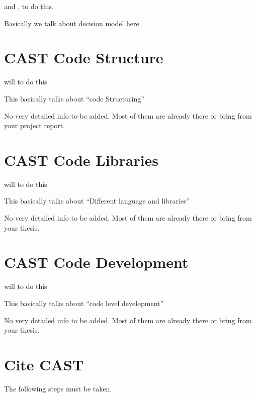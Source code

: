 \documentclass[letterpaper,10pt,english]{sphinxmanual}
\begin{document}
\sphinxAtStartPar
{} and  , to do this.

\sphinxAtStartPar
Basically we talk about decision model here


\chapter{CAST Code Structure}
\label{\detokenize{contents/develop/code_structure:cast-code-structure}}\label{\detokenize{contents/develop/code_structure::doc}}
\sphinxAtStartPar
{} will to do this

\sphinxAtStartPar
This basically talks about “code Structuring”

\sphinxAtStartPar
No very detailed info to be added.
Most of them are already there\sphinxhyphen{} or bring from your project report.


\chapter{CAST Code Libraries}
\label{\detokenize{contents/develop/code_libraries:cast-code-libraries}}\label{\detokenize{contents/develop/code_libraries::doc}}
\sphinxAtStartPar
{} will to do this

\sphinxAtStartPar
This basically talks about “Different language and libraries”

\sphinxAtStartPar
No very detailed info to be added.
Most of them are already there\sphinxhyphen{} or bring from your thesis.


\chapter{CAST Code Development}
\label{\detokenize{contents/develop/code_develop:cast-code-development}}\label{\detokenize{contents/develop/code_develop::doc}}
\sphinxAtStartPar
{} will to do this

\sphinxAtStartPar
This basically talks about “code level development”

\sphinxAtStartPar
No very detailed info to be added.
Most of them are already there\sphinxhyphen{} or bring from your thesis.


\chapter{Cite CAST}
\label{\detokenize{contents/ref/cite:cite-cast}}\label{\detokenize{contents/ref/cite::doc}}
\sphinxAtStartPar
The following steps must be taken.
\end{document}
